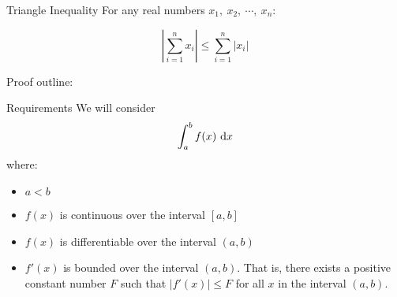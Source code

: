 \begin{frame}[t]
\AnswerSpace
\begin{block}{Triangle Inequality}%
For any real numbers $x_1,~x_2,~\cdots,~x_n$:

\[\left|\sum_{i=1}^n x_i \right|\leq \sum_{i=1}^n |x_i|\]
\end{block}
Proof outline:\vfill

\end{frame}
 \begin{frame}[t]{Requirements}
 We will consider
 \[\int_a^b f(x)~\text{d} x\]
 where:
 \begin{itemize}
 \item $a<b$
 \item $f(x)$ is continuous over the interval $[a,b]$
  \item $f(x)$ is differentiable over the interval $(a,b)$
  \item $f'(x)$ is bounded over the interval $(a,b)$. 
  That is, there exists a positive constant number $F$ such that $|f'(x)|\leq F$ for all $x$ in the interval $(a,b)$.
 \end{itemize}
\end{frame}
